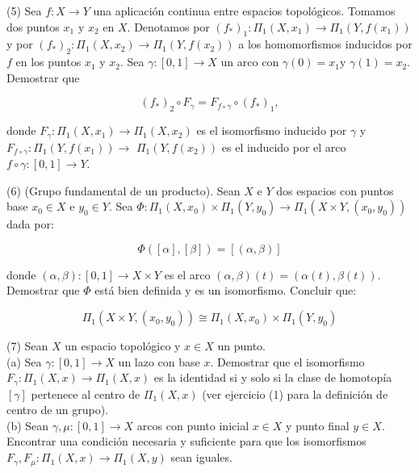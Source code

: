 \documentclass[
  a4paper,
  spanish,
  12pt,
]{scrartcl}
\begin{document}
\begin{ejer}
(5) Sea $f: X \rightarrow Y$ una aplicación continua entre espacios topológicos. Tomamos dos puntos $x_{1}$ y $x_{2}$ en $X$. Denotamos por $\left(f_{*}\right)_{1}: \Pi_{1}\left(X, x_{1}\right) \rightarrow \Pi_{1}\left(Y, f\left(x_{1}\right)\right)$ y por $\left(f_{*}\right)_{2}: \Pi_{1}\left(X, x_{2}\right) \rightarrow \Pi_{1}\left(Y, f\left(x_{2}\right)\right)$ a los homomorfismos inducidos por $f$ en los puntos $x_{1}$ y $x_{2}$. Sea $\gamma:[0,1] \rightarrow X$ un arco con $\gamma(0)=x_{1} \mathrm{y}$ $\gamma(1)=x_{2}$. Demostrar que

$$
\left(f_{*}\right)_{2} \circ F_{\gamma}=F_{f \circ \gamma} \circ\left(f_{*}\right)_{1},
$$

donde $F_{\gamma}: \Pi_{1}\left(X, x_{1}\right) \rightarrow \Pi_{1}\left(X, x_{2}\right)$ es el isomorfismo inducido por $\gamma$ y $F_{f \circ \gamma}: \Pi_{1}\left(Y, f\left(x_{1}\right)\right) \rightarrow$ $\Pi_{1}\left(Y, f\left(x_{2}\right)\right)$ es el inducido por el arco $f \circ \gamma:[0,1] \rightarrow Y$.\\
\end{ejer}

\begin{ejer}
(6) (Grupo fundamental de un producto). Sean $X$ e $Y$ dos espacios con puntos base $x_{0} \in X$ e $y_{0} \in Y$. Sea $\Phi: \Pi_{1}\left(X, x_{0}\right) \times \Pi_{1}\left(Y, y_{0}\right) \rightarrow \Pi_{1}\left(X \times Y,\left(x_{0}, y_{0}\right)\right)$ dada por:


$$
\Phi([\alpha],[\beta])=[(\alpha, \beta)]
$$

donde $(\alpha, \beta):[0,1] \rightarrow X \times Y$ es el arco $(\alpha, \beta)(t)=(\alpha(t), \beta(t))$. Demostrar que $\Phi$ está bien definida y es un isomorfismo. Concluir que:

$$
\Pi_{1}\left(X \times Y,\left(x_{0}, y_{0}\right)\right) \cong \Pi_{1}\left(X, x_{0}\right) \times \Pi_{1}\left(Y, y_{0}\right)
$$
\end{ejer}


\begin{ejer}
(7) Sean $X$ un espacio topológico y $x \in X$ un punto.\\
(a) Sea $\gamma:[0,1] \rightarrow X$ un lazo con base $x$. Demostrar que el isomorfismo $F_{\gamma}: \Pi_{1}(X, x) \rightarrow \Pi_{1}(X, x)$ es la identidad si y solo si la clase de homotopía $[\gamma]$ pertenece al centro de $\Pi_{1}(X, x)$ (ver ejercicio (1) para la definición de centro de un grupo).\\
(b) Sean $\gamma, \mu:[0,1] \rightarrow X$ arcos con punto inicial $x \in X$ y punto final $y \in X$. Encontrar una condición necesaria y suficiente para que los isomorfismos $F_{\gamma}, F_{\mu}: \Pi_{1}(X, x) \rightarrow \Pi_{1}(X, y)$ sean iguales.\\
\end{ejer}
\end{document}

